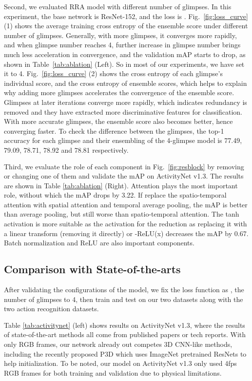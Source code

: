 \documentclass[runningheads]{llncs}
\begin{document}
Second, we evaluated RRA model with different number of glimpses. In this experiment, the base network is ResNet-152, and the loss is .
Fig.~\ref{fig:loss_curve} (1) shows the average training cross entropy of the ensemble score under different number of glimpses. Generally, with more glimpses, it converges more rapidly, and when glimpse number reaches 4, further increase in glimpse number brings much less acceleration in convergence, and the validation mAP starts to drop, as shown in Table~\ref{tab:ablation} (Left). So in most of our experiments, we have set it to 4. Fig.~\ref{fig:loss_curve} (2) shows the cross entropy of each glimpse's individual score, and the cross entropy of ensemble scores, which helps to explain why adding more glimpses accelerates the convergence of the ensemble score. Glimpses at later iterations converge more rapidly,  which indicates redundancy is removed and they have extracted more discriminative features for classification. With more accurate glimpses, the ensemble score also becomes better, hence converging faster. To check the difference between the glimpses, the top-1 accuracy for each glimpse and their ensembling of the 4-glimpse model is 77.49, 79.09, 78.71, 78.92 and 78.81 respectively. 

Third, we evaluate the role of each component in Fig.~\ref{fig:resblock} by removing or changing one of them and validate the mAP on ActivityNet v1.3. The results are shown in Table \ref{tab:ablation} (Right). Attention plays the most important role, without which the mAP drops by 3.22. If replace the spatio-temporal attention with spatial attention and temporal average pooling, the mAP is better than average pooling, but still worse than spatio-temporal attention. The tanh activation is more suitable as the activation for the reduction as replacing it with a linear transform (removing it directly) or -ReLU(x) decreases the mAP by 0.67. Batch normalization and ReLU are also important components.

\subsection{Comparison with State-of-the-arts}




After validating the configurations of the model, we fix the loss function as , the number of glimpses to 4, then train and test on our two datasets along with the two action recognition datasets.

Table \ref{tab:activitynet} (left) shows results on ActivityNet v1.3, where the results of state-of-the-art methods all come from published papers or tech reports. With only RGB frames, our network already out competes 3D CNN-like methods, including the recently proposed P3D \cite{qiu2017learning} which uses ImageNet pretrained ResNets to help initialization. To be noted, our model on ActivityNet v1.3 only used 4fps RGB frames for both training and validation due to physical limitations.
\end{document}
